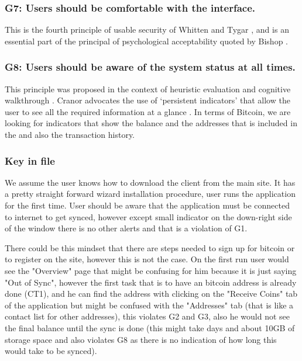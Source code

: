 \subsubsection*{G7: Users should be comfortable with the interface.} This is the fourth principle of usable security of Whitten and Tygar \cite{johnny}, and is an essential part of the principal of psychological acceptability quoted by Bishop \cite{pa}. 


\subsubsection*{G8: Users should be aware of the system status at all times.} This principle was proposed in the context of heuristic evaluation \cite{cw} and cognitive walkthrough \cite{pvo}. Cranor advocates the use of `persistent indicators' that allow the user to see all the required information at a glance \cite{p3p}. In terms of Bitcoin, we are looking for indicators that show the balance and the addresses that is included in the \walletfile and also the transaction history.

\subsubsection{Key in file}
We assume the user knows how to download the client from the main site. It has a pretty straight forward wizard installation procedure, user runs the application for the first time. User should be aware that the application must be connected to internet to get synced, however except small indicator on the down-right side of the window there is no other alerts and that is a violation of G1. \

There could be this mindset that there are steps needed to sign up for bitcoin or to register on the site, however this is not the case. On the first run user would see the "Overview" page that might be confusing for him because it is just saying "Out of Sync", however the first task that is to have an bitcoin address is already done (CT1), and he can find the address with clicking on the "Receive Coins" tab of the application but might be confused with the "Addresses" tab (that is like a contact list for other addresses), this violates G2 and G3, also he would not see the final balance until the sync is done (this might take days and about 10GB of storage space and also violates G8 as there is no indication of how long this would take to be synced). \


